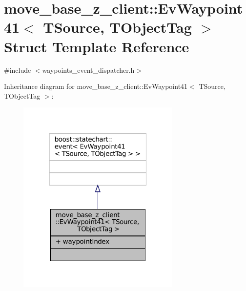 \hypertarget{structmove__base__z__client_1_1EvWaypoint41}{}\section{move\+\_\+base\+\_\+z\+\_\+client\+:\+:Ev\+Waypoint41$<$ T\+Source, T\+Object\+Tag $>$ Struct Template Reference}
\label{structmove__base__z__client_1_1EvWaypoint41}


{\ttfamily \#include $<$waypoints\+\_\+event\+\_\+dispatcher.\+h$>$}



Inheritance diagram for move\+\_\+base\+\_\+z\+\_\+client\+:\+:Ev\+Waypoint41$<$ T\+Source, T\+Object\+Tag $>$\+:
\nopagebreak
\begin{figure}[H]
\begin{center}
\leavevmode
\includegraphics[width=229pt]{structmove__base__z__client_1_1EvWaypoint41__inherit__graph}
\end{center}
\end{figure}


